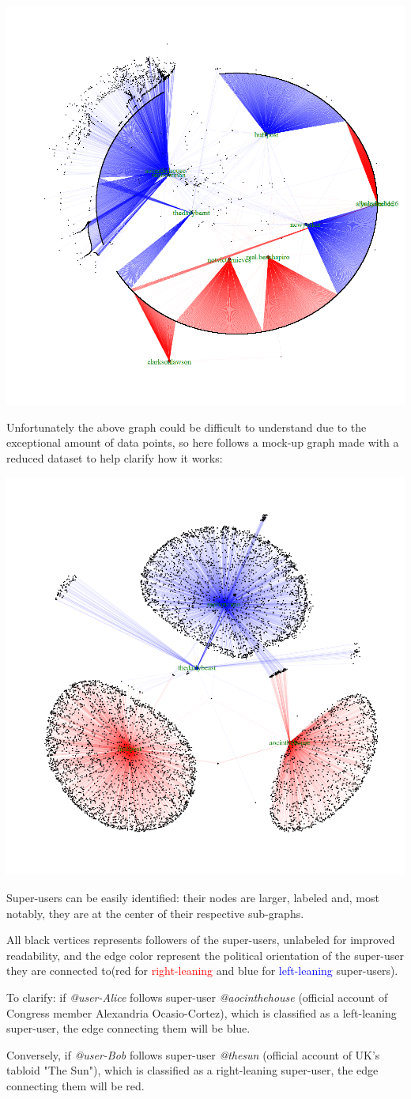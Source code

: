 \aCapo{}
\includegraphics[width = .5\textwidth]{images/final_combined_san_graph.png}

Unfortunately the above graph could be difficult to understand due to the exceptional amount of data points, so here follows a mock-up graph made with a reduced dataset to help clarify how it works:

\aCapo{}
\includegraphics[width = .5\textwidth]{images/mockUP_san.png}

Super-users can be easily identified: their nodes are larger, labeled and, most notably, they are at the center of their respective sub-graphs. 

All black vertices represents followers of the super-users, unlabeled for improved readability, and the edge color represent the political orientation of the super-user they are connected to(red for \textcolor{red}{right-leaning} and blue for \textcolor{blue}{left-leaning} super-users). 

To clarify: if \textit{@user-Alice} follows super-user \textit{@aocinthehouse} (official account of Congress member Alexandria Ocasio-Cortez), which is classified as a left-leaning super-user, the edge connecting them will be blue. 

Conversely, if \textit{@user-Bob} follows super-user \textit{@thesun} (official account of UK's tabloid "The Sun"), which is classified as a right-leaning super-user, the edge connecting them will be red.

